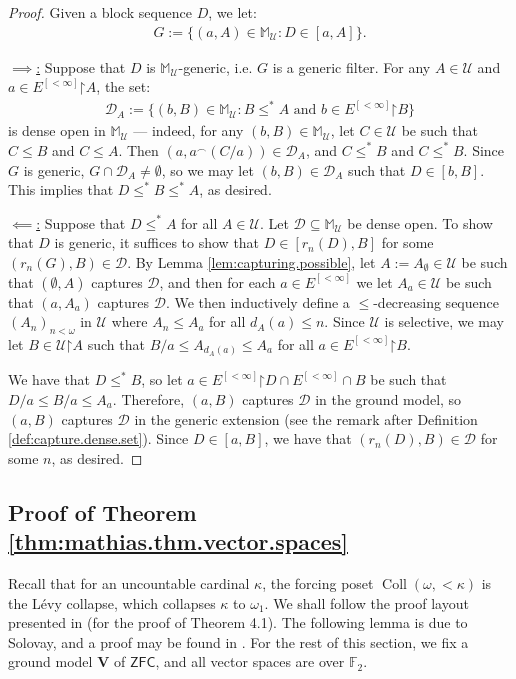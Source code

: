 \documentclass[11pt,reqno]{amsart}
\theoremstyle{plain}
\numberwithin{equation}{section}
\theoremstyle{definition}
\newcommand{\func}{\operatorname}
\newcommand{\cal}{\mathcal}
\renewcommand{\bf}{\mathbf}
\newcommand{\ZFC}{\mathsf{ZFC}}
\newcommand{\restrictedto}{\mathord{\upharpoonright}}
\newcommand{\Coll}{\func{Coll}}
\newcommand{\U}{\cal{U}}
\newcommand{\V}{\bf{V}}
\newcommand{\D}{\cal{D}}
\begin{document}
\begin{proof}
    Given a block sequence $D$, we let:
    \begin{align*}
        G := \{(a,A) \in \mathbb{M}_\U : D \in [a,A]\}.
    \end{align*}

    \underline{$\implies$:} Suppose that $D$ is $\mathbb{M}_\U$-generic, i.e. $G$ is a generic filter. For any $A \in \U$ and $a \in E^{[<\infty]}\restrictedto A$, the set:
    \begin{align*}
        \D_A := \{(b,B) \in \mathbb{M}_\U : B \leq^* A \text{ and } b \in E^{[<\infty]}\restrictedto B\}
    \end{align*}
    is dense open in $\mathbb{M}_\U$ --- indeed, for any $(b,B) \in \mathbb{M}_\U$, let $C \in \U$ be such that $C \leq B$ and $C \leq A$. Then $(a,a^\frown(C/a)) \in \D_A$, and $C \leq^* B$ and $C \leq^* B$. Since $G$ is generic, $G \cap \D_A \neq \emptyset$, so we may let $(b,B) \in \D_A$ such that $D \in [b,B]$. This implies that $D \leq^* B \leq^* A$, as desired.

    \underline{$\impliedby$:} Suppose that $D \leq^* A$ for all $A \in \U$. Let $\D \subseteq \mathbb{M}_\U$ be dense open. To show that $D$ is generic, it suffices to show that $D \in [r_n(D),B]$ for some $(r_n(G),B) \in \D$. By Lemma \ref{lem:capturing.possible}, let $A := A_\emptyset \in \U$ be such that $(\emptyset,A)$ captures $\D$, and then for each $a \in E^{[<\infty]}$ we let $A_a \in \U$ be such that $(a,A_a)$ captures $\D$. We then inductively define a $\leq$-decreasing sequence $(A_n)_{n<\omega}$ in $\U$ where $A_n \leq A_a$ for all $d_A(a) \leq n$. Since $\U$ is selective, we may let $B \in \U\restrictedto A$ such that $B/a \leq A_{d_A(a)} \leq A_a$ for all $a \in E^{[<\infty]}\restrictedto B$. 

    We have that $D \leq^* B$, so let $a \in E^{[<\infty]}\restrictedto D \cap E^{[<\infty]} \cap B$  be such that $D/a \leq B/a \leq A_a$. Therefore, $(a,B)$ captures $\D$ in the ground model, so $(a,B)$ captures $\D$ in the generic extension (see the remark after Definition \ref{def:capture.dense.set}). Since $D \in [a,B]$, we have that $(r_n(D),B) \in \D$ for some $n$, as desired.
\end{proof}

\subsection{Proof of Theorem \ref{thm:mathias.thm.vector.spaces}}
Recall that for an uncountable cardinal $\kappa$, the forcing poset $\Coll(\omega,<\!\kappa)$ is the L\'{e}vy collapse, which collapses $\kappa$ to $\omega_1$. We shall follow the proof layout presented in \cite{NN18} (for the proof of Theorem 4.1). The following lemma is due to Solovay, and a proof may be found in \cite{solovay}. For the rest of this section, we fix a ground model $\V$ of $\ZFC$, and all vector spaces are over $\mathbb{F}_2$.
\end{document}
